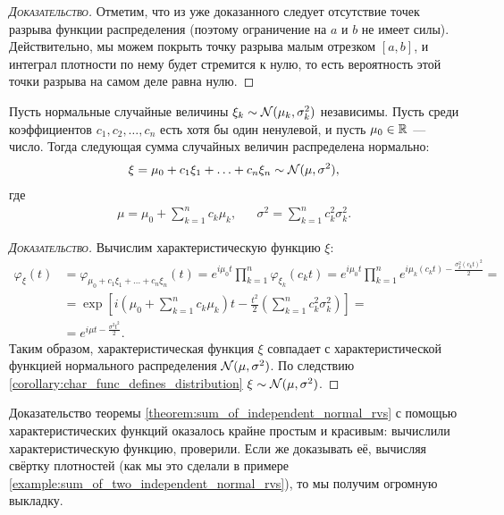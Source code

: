 \documentclass[../main.tex]{subfiles}
\begin{document}
\begin{proof}[\normalfont\textsc{Доказательство}]
 Отметим, что из уже доказанного следует отсутствие точек разрыва функции распределения (поэтому ограничение на $ a $ и $ b $ не имеет силы). Действительно, мы можем покрыть точку разрыва малым отрезком $ [a,b] $, и интеграл плотности по нему будет стремится к нулю, то есть вероятность этой точки разрыва на самом деле равна нулю.
\end{proof}

\begin{thm}
 \label{theorem:sum_of_independent_normal_rvs}
 Пусть нормальные случайные величины $ \xi_k \sim \mathcal N(\mu_k, \sigma_k^{2}) $ независимы. Пусть среди коэффициентов $ c_1, c_2, \ldots, c_n $ есть хотя бы один ненулевой, и пусть $ \mu_0 \in \mathbb{R} $ --- число. Тогда следующая сумма случайных величин распределена нормально:
 \begin{align*}
  \xi = \mu_0 + c_1 \xi_1 + \ldots + c_n \xi_n \sim \mathcal N(\mu, \sigma^{2}),
 \end{align*} где
 \begin{align*}
  \mu = \mu_0 + \sum_{k=1}^{n}c_k\mu_k, &&
  \sigma^{2} = \sum_{k=1}^{n}c_k^{2}\sigma_k^{2}.
 \end{align*}
\end{thm}
\begin{proof}[\normalfont\textsc{Доказательство}]
 Вычислим характеристическую функцию $ \xi $:
 \begin{align*}
  \varphi_\xi(t) &= \varphi_{\mu_0 + c_1\xi_1 + \ldots + c_n\xi_n}(t) = e^{i\mu_0 t} \prod_{k=1}^{n}\varphi_{\xi_k}(c_k t) = e^{i\mu_0 t} \prod_{k=1}^{n} e^{i\mu_k (c_k t) - \frac{\sigma_k^{2}(c_k t)^{2}}{2}} = \\
  &= \exp \left[ i \left( \mu_0 + \sum_{k=1}^{n}c_k\mu_k \right) t - \frac{t^{2}}{2} \left( \sum_{k=1}^{n}c_k^{2}\sigma_k^{2} \right) \right] = \\
  &= e^{i\mu t - \frac{\sigma^{2}t^{2}}{2}}.
 \end{align*} Таким образом, характеристическая функция $ \xi $ совпадает с характеристической функцией нормального распределения $ \mathcal N(\mu,\sigma^{2}) $. По следствию \ref{corollary:char_func_defines_distribution} $ \xi \sim \mathcal N(\mu,\sigma^{2}) $.
\end{proof}

Доказательство теоремы \ref{theorem:sum_of_independent_normal_rvs} с помощью характеристических функций оказалось крайне простым и красивым: вычислили характеристическую функцию, проверили. Если же доказывать её, вычисляя свёртку плотностей (как мы это сделали в примере \ref{example:sum_of_two_independent_normal_rvs}), то мы получим огромную выкладку.
\end{document}
